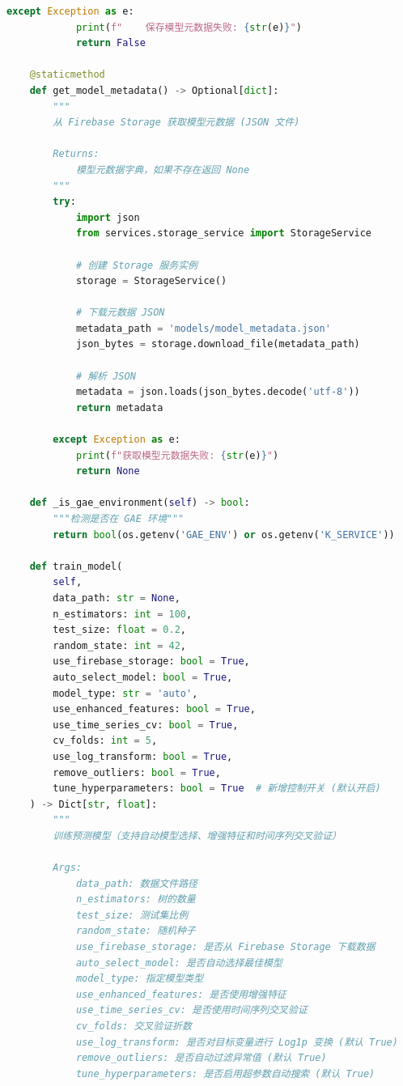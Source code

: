 \begin{lstlisting}[style=codestyle, language=Python, caption={机器学习预测服务}]
        except Exception as e:
            print(f"    保存模型元数据失败: {str(e)}")
            return False
    
    @staticmethod
    def get_model_metadata() -> Optional[dict]:
        """
        从 Firebase Storage 获取模型元数据 (JSON 文件)
        
        Returns:
            模型元数据字典，如果不存在返回 None
        """
        try:
            import json
            from services.storage_service import StorageService
            
            # 创建 Storage 服务实例
            storage = StorageService()
            
            # 下载元数据 JSON
            metadata_path = 'models/model_metadata.json'
            json_bytes = storage.download_file(metadata_path)
            
            # 解析 JSON
            metadata = json.loads(json_bytes.decode('utf-8'))
            return metadata
                
        except Exception as e:
            print(f"获取模型元数据失败: {str(e)}")
            return None
    
    def _is_gae_environment(self) -> bool:
        """检测是否在 GAE 环境"""
        return bool(os.getenv('GAE_ENV') or os.getenv('K_SERVICE'))

    def train_model(
        self, 
        data_path: str = None,
        n_estimators: int = 100,
        test_size: float = 0.2,
        random_state: int = 42,
        use_firebase_storage: bool = True,
        auto_select_model: bool = True,
        model_type: str = 'auto',
        use_enhanced_features: bool = True,
        use_time_series_cv: bool = True,
        cv_folds: int = 5,
        use_log_transform: bool = True,
        remove_outliers: bool = True,
        tune_hyperparameters: bool = True  # 新增控制开关 (默认开启)
    ) -> Dict[str, float]:
        """
        训练预测模型（支持自动模型选择、增强特征和时间序列交叉验证）
        
        Args:
            data_path: 数据文件路径
            n_estimators: 树的数量
            test_size: 测试集比例
            random_state: 随机种子
            use_firebase_storage: 是否从 Firebase Storage 下载数据
            auto_select_model: 是否自动选择最佳模型
            model_type: 指定模型类型
            use_enhanced_features: 是否使用增强特征
            use_time_series_cv: 是否使用时间序列交叉验证
            cv_folds: 交叉验证折数
            use_log_transform: 是否对目标变量进行 Log1p 变换 (默认 True)
            remove_outliers: 是否自动过滤异常值 (默认 True)
            tune_hyperparameters: 是否启用超参数自动搜索 (默认 True) 
            

\end{lstlisting}
